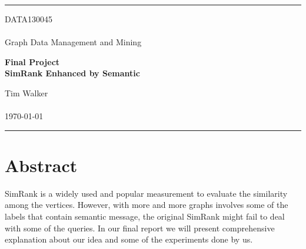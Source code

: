 \documentclass[a4paper, 12pt]{article} %
\begin{document}

\fancyhead[C]{}
\hrule \medskip %
\begin{minipage}{0.295\textwidth} %
	\raggedright
	DATA130045\\ %
	\footnotesize %
	\hfill\\
	Graph Data Management and Mining\\ %
\end{minipage}
\begin{minipage}{0.4\textwidth} %
	\centering
	\large %
	\textbf{Final Project}\\ %
	\normalsize %
	\textbf{SimRank Enhanced by Semantic}\\ %
\end{minipage}
\begin{minipage}{0.295\textwidth} %
	\raggedleft
	Tim Walker\\ %
	\footnotesize %
	\hfill\\
	\today\\ %
\end{minipage}
\medskip\hrule %
\bigskip


\section*{\textbf{Abstract}}
    
    SimRank is a widely used and popular measurement to evaluate the similarity among the vertices. However, with more and more graphs involves some of the labels that contain semantic message, the original SimRank might fail to deal with some of the queries. In our final report we will present comprehensive explanation about our idea and some of the experiments done by us.


\bigskip

\end{document}
